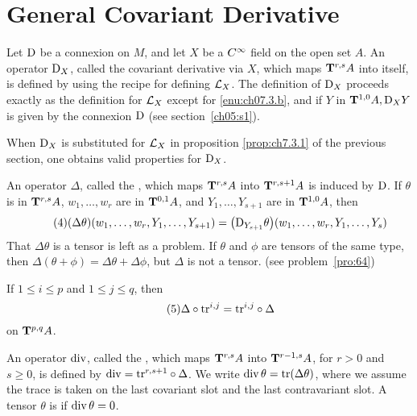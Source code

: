 \documentclass[../main]{subfiles}
\begin{document}
\section{General Covariant Derivative}\label{ch07:s4}
Let $\connection$ be a connexion on $M$, and let $X$ be a $\CInfty$ field on the open set $A$. An operator $\connection_{X}$, called the covariant derivative via $X$, which maps $\tensorbundle{A}{r}{ s}$ into itself, is defined by using the recipe for defining $\liederiv{X}$. The definition of $\connection_{X}$ proceeds exactly as the definition for $\liederiv{X}$ except for \ref{enu:ch07.3.b}, and if $Y$ in $\tensorbundle{A}{1}{0}, \connection_{X} Y$ is given by the connexion $\connection$ (see section~\ref{ch05:s1}).

When $\connection_{X}$ is substituted for $\liederiv{X}$ in proposition \ref{prop:ch7.3.1} of the previous section, one obtains valid properties for $\connection_{X}$.

An operator $\Delta$, called the , which maps $\tensorbundle{A}{r}{ s}$ into $\tensorbundle{A}{r}{ s+1}$ is induced by $\connection$. If $\theta$ is in $\tensorbundle{A}{r}{ s}$, $w_{1}, \ldots, w_{r}$ are in $\tensorbundle{A}{0}{1}$, and $Y_{1}, \ldots, Y_{s+1}$ are in $\tensorbundle{A}{1}{ 0}$, then
\begin{equation}\tag{4}
\label{eqn:ch07.4}
(\Delta \theta) (w_1, \ldots, w_r, Y_1, \ldots, Y_{s + 1}) = \bigl(\connection_{Y_{s + 1}} \theta\bigr) (w_1, \ldots, w_r, Y_1, \ldots, Y_s)
\end{equation}
That $\Delta \theta$ is a tensor is left as a problem. If $\theta$ and $\phi$ are tensors of the same type, then $\Delta (\theta + \phi) = \Delta \theta + \Delta \phi$, but $\Delta$ is not a tensor. (see problem~\ref{pro:64})

If $1 \le i \le p$ and $1 \le j \le q$, then
\begin{equation}\tag{5}
\label{eqn:ch07.5}
\Delta \circ \tr^{i, j} = \tr^{i, j} \circ \Delta 
\end{equation}
on $\tensorbundle{A}{p}{ q}$. 

An operator $\Div$, called the , which maps $\tensorbundle{A}{r}{ s}$ into $\tensorbundle{A}{r - 1}{ s}$, for $r > 0$ and $s \ge 0$, is defined by $\Div = \tr^{r, s + 1} \circ \Delta$. We write $\Div \theta = \tr(\Delta \theta)$, where we assume the trace is taken on the last covariant slot and the last contravariant slot. A tensor $\theta$ is  if $\Div \theta = 0$. 
\end{document}
